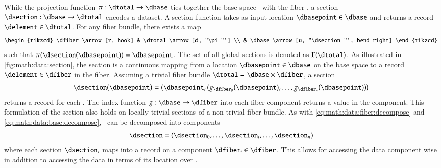 \documentclass[journal]{vgtc}                %
\begin{document}
 While the projection function $\pi:\dtotal \rightarrow\dbase$ ties together the base space \dbase\ with the fiber \dfiber, a section $\dsection: \dbase\rightarrow \dtotal$ encodes a dataset. A section function takes as input location $\dbasepoint \in \dbase$ and returns a record $\delement \in \dtotal$. For any fiber bundle, there exists a map
 \begin{equation}
     \begin{tikzcd}
         \dfiber \arrow[r, hook] & \dtotal \arrow[d, "\pi"'] \\
                           & \dbase \arrow[u, "\dsection"', bend right]
     \end{tikzcd}
 \end{equation}
  such that $\pi(\dsection(\dbasepoint)) = \dbasepoint$. The set of all global sections is denoted as $\Gamma(\dtotal)$. As illustrated in \autoref{fig:math:data:section}, the section is a continuous mapping from a location $\dbasepoint \in \dbase$ on the base space to a record $\delement \in \dfiber$ in the fiber. Assuming a trivial fiber bundle $\dtotal = \dbase \times \dfiber$, a section
 \begin{equation}
     \label{eq:section_return}
     \dsection(\dbasepoint) = (\dbasepoint, (g_{\dfiber_{0}}(\dbasepoint), \ldots, g_{\dfiber_{n}}(\dbasepoint)))
 \end{equation}
 returns a record for each \dbasepoint. The index function $g: \dbase \rightarrow \dfiber$ into each fiber component returns a value in the component. This formulation of the section also holds on locally trivial sections of a non-trivial fiber bundle. As with \autoref{eq:math:data:fiber:decompose} and \autoref{eq:math:data:base:decompose}, \dsection\ can be decomposed into components 
 \begin{equation}
 \label{eq:math:data:section:decompose}
 \dsection= (\dsection_0,\ldots, \dsection_i, \dots, \dsection_n) 
 \end{equation}
 where each section $\dsection_i$ maps into a record on a component $\dfiber_i \in \dfiber$. This allows for accessing the data component wise in addition to accessing the data in terms of its location over \dbase.
\end{document}
